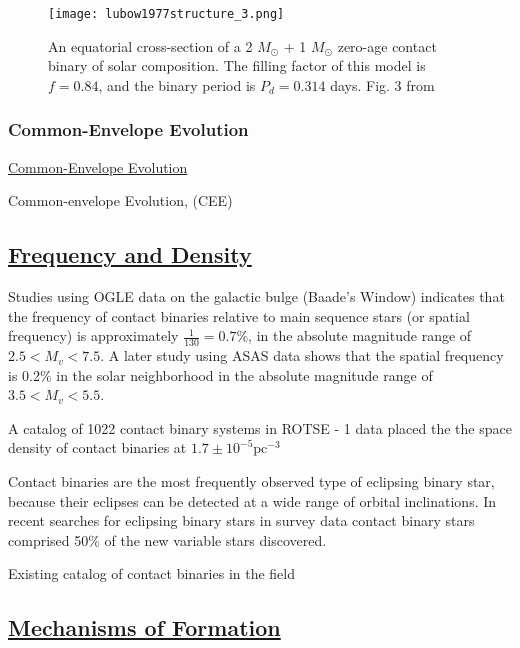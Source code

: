 \documentclass[12pt]{article} %
\numberwithin{equation}{section} %
\begin{document}
\begin{figure}[H]
\centering
\texttt{[image: lubow1977structure\_3.png]}
\caption{An equatorial cross-section of a 2 $M_{\odot}$ + 1 $M_{\odot}$ zero-age contact binary of solar composition. The filling factor of this model is $f = 0.84$, and the binary period is $P_{d} = 0.314$ days. Fig. 3 from \citet{lubow1977structure}}
\label{fig: lubow1977structure_3}
\end{figure}

\subsubsection{Common-Envelope Evolution}{\hyperlink{toc}{Common-Envelope Evolution}} \label{sec: Common-Envelope Evolution}

Common-envelope Evolution, (CEE) \citep{ivanova2013common}

\subsection[Frequency and Density]{\hyperlink{toc}{Frequency and Density}}

 \citep{rucinski1998contact} Studies using OGLE data on the galactic bulge (Baade's Window) indicates that the frequency of contact binaries relative to main sequence stars (or spatial frequency) is approximately $\frac{1}{130} = 0.7\%$, in the absolute magnitude range of $2.5 < M_{v} < 7.5$. A later study using ASAS data shows that the spatial frequency is 0.2\% in the solar neighborhood \citep{rucinski2006luminosity} in the absolute magnitude range of $3.5 < M_{v} < 5.5$.

A catalog of 1022 contact binary systems in ROTSE - 1 data placed the the space density of contact binaries at $1.7 \pm 10^{-5} \text{pc}^{-3}$ \citep{gettel2006catalogue}
 
Contact binaries are the most frequently observed type of eclipsing binary star, because their eclipses can be detected at a wide range of orbital inclinations. In recent searches for eclipsing binary stars in survey data \citep{drake2014catalina} contact binary stars comprised 50\% of the new variable stars discovered. 

Existing catalog of contact binaries in the field \citep{pribulla2003catalogue}




\subsection[Mechanisms of Formation]{\hyperlink{toc}{Mechanisms of Formation}}
\end{document}
